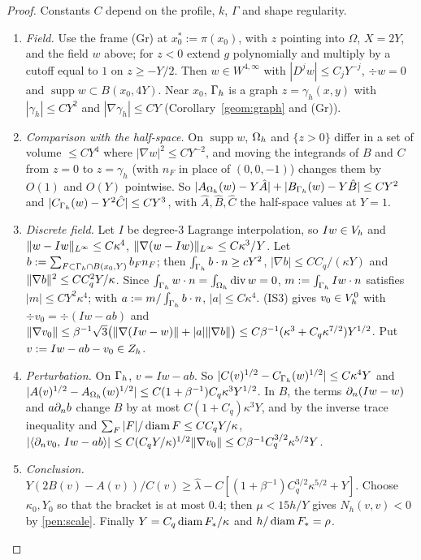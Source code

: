 \begin{proof}
Constants $C$ depend on the profile, $k$, $\Gamma$ and shape regularity.
\begin{enumerate}
\item \emph{Field.} Use the frame (Gr) at $x_0^\ast:=\pi(x_0)$, with $z$ pointing into $\Omega$, $X=2Y$, and the field $w$ above; for $z<0$ extend $g$ polynomially and multiply by a cutoff equal to $1$ on $z\ge-Y/2$. Then $w\in W^{4,\infty}$ with $|D^jw|\le C_jY^{-j}$, $\div w=0$ and $\operatorname{supp}w\subset B(x_0,4Y)$. Near $x_0$, $\Gamma_h$ is a graph $z=\gamma_h(x,y)$ with $|\gamma_h|\le CY^2$ and $|\nabla\gamma_h|\le CY$ (Corollary~\ref{geom:graph} and (Gr)).
\item \emph{Comparison with the half-space.} On $\operatorname{supp}w$, $\Omega_h$ and $\{z>0\}$ differ in a set of volume $\le CY^4$ where $|\nabla w|^2\le CY^{-2}$, and moving the integrands of $B$ and $C$ from $z=0$ to $z=\gamma_h$ (with $n_F$ in place of $(0,0,-1)$) changes them by $O(1)$ and $O(Y)$ pointwise. So $|A_{\Omega_h}(w)-Y\hat A|+|B_{\Gamma_h}(w)-Y\hat B|\le CY^2$ and $|C_{\Gamma_h}(w)-Y^2\hat C|\le CY^3$, with $\hat A,\hat B,\hat C$ the half-space values at $Y=1$.
\item \emph{Discrete field.} Let $I$ be degree-$3$ Lagrange interpolation, so $Iw\in V_h$ and $\lVert w-Iw\rVert_{L^\infty}\le C\kappa^4$, $\lVert \nabla(w-Iw)\rVert_{L^\infty}\le C\kappa^3/Y$. Let $b:=\sum_{F\subset\Gamma_h\cap B(x_0,Y)}b_Fn_F$; then $\int_{\Gamma_h}b\cdot n\ge cY^2$, $|\nabla b|\le CC_q/(\kappa Y)$ and $\lVert \nabla b\rVert^2\le CC_q^2Y/\kappa$. Since $\int_{\Gamma_h}w\cdot n=\int_{\Omega_h}\operatorname{div} w=0$, $m:=\int_{\Gamma_h}Iw\cdot n$ satisfies $|m|\le CY^2\kappa^4$; with $a:=m/\int_{\Gamma_h}b\cdot n$, $|a|\le C\kappa^4$. (IS3) gives $v_0\in V_h^0$ with $\div v_0=\div(Iw-ab)$ and $\lVert \nabla v_0\rVert\le\beta^{-1}\sqrt3\bigl(\lVert \nabla(Iw-w)\rVert+|a|\lVert \nabla b\rVert\bigr)\le C\beta^{-1}(\kappa^3+C_q\kappa^{7/2})Y^{1/2}$. Put $v:=Iw-ab-v_0\in Z_h$.
\item \emph{Perturbation.} On $\Gamma_h$, $v=Iw-ab$. So $|C(v)^{1/2}-C_{\Gamma_h}(w)^{1/2}|\le C\kappa^4Y$ and $|A(v)^{1/2}-A_{\Omega_h}(w)^{1/2}|\le C(1+\beta^{-1})C_q\kappa^3Y^{1/2}$. In $B$, the terms $\partial_n(Iw-w)$ and $a\partial_n b$ change $B$ by at most $C(1+C_q)\kappa^3Y$, and by the inverse trace inequality and $\sum_F|F|/\operatorname{diam} F\le CC_qY/\kappa$, $|\langle \partial_n v_0,\, Iw-ab\rangle|\le C(C_qY/\kappa)^{1/2}\lVert \nabla v_0\rVert\le C\beta^{-1}C_q^{3/2}\kappa^{5/2}Y$.
\item \emph{Conclusion.} $Y(2B(v)-A(v))/C(v)\ge\hat\lambda-C[(1+\beta^{-1})C_q^{3/2}\kappa^{5/2}+Y]$. Choose $\kappa_0,Y_0$ so that the bracket is at most $0.4$; then $\mu<15h/Y$ gives $N_h(v,v)<0$ by \eqref{pen:scale}. Finally $Y=C_q\operatorname{diam} F_\ast/\kappa$ and $h/\operatorname{diam} F_\ast=\rho$.\qedhere
\end{enumerate}
\end{proof}

